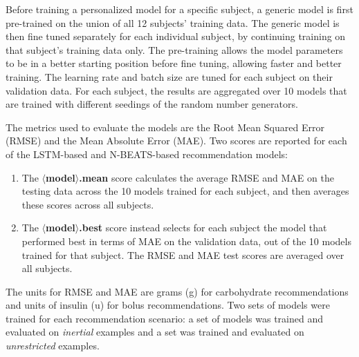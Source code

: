 \documentclass[journal,article,submit,moreauthors,pdftex]{Definitions/mdpi}
\begin{document}
Before training a personalized model for a specific subject, a generic model is first pre-trained on the union of all 12 subjects' training data. The generic model is then fine tuned separately for each individual subject, by continuing training on that subject's training data only. The pre-training allows the model parameters to be in a better starting position before fine tuning, allowing faster and better training. The learning rate and batch size are tuned for each subject on their validation data. 
For each subject, the results are aggregated over 10 models that are trained with different seedings of the random number generators.

The metrics used to evaluate the models are the Root Mean Squared Error (RMSE) and the Mean Absolute Error (MAE). Two scores are reported for each of the LSTM-based and N-BEATS-based recommendation models:
\begin{enumerate}
    \item The {\bf $\langle$model$\rangle$.mean} score calculates the average RMSE and MAE on the testing data across the 10 models trained for each subject, and then averages these scores across all subjects.
    \item The {\bf $\langle$model$\rangle$.best} score instead selects for each subject the model that performed best in terms of MAE on the validation data, out of the 10 models trained for that subject. The RMSE and MAE test scores are averaged over all subjects.
\end{enumerate}
The units for RMSE and MAE are grams (g) for carbohydrate recommendations and units of insulin (u) for bolus recommendations.
Two sets of models were trained for each recommendation scenario: a set of models was trained and evaluated on {\it inertial} examples and a set was trained and evaluated on {\it unrestricted} examples. 

\end{document}
